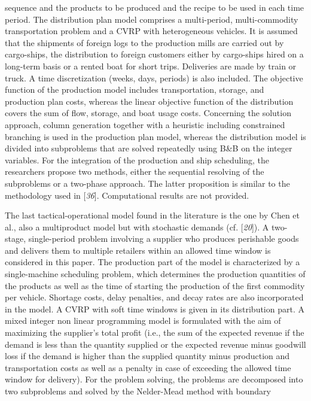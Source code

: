  sequence and the products to be produced and the recipe to be used in each time
 period. The distribution plan model comprises a multi-period, multi-commodity
 transportation problem and a CVRP with heterogeneous vehicles. It is assumed that the
 shipments of foreign logs to the production mills are carried out by cargo-ships, the
 distribution to foreign customers either by cargo-ships hired on a long-term basis or
 a rented boat for short trips. Deliveries are made by train or truck. A time
 discretization (weeks, days, periods) is also included. The objective function of the
 production model includes transportation, storage, and production plan costs, whereas
 the linear objective function of the distribution covers the sum of flow, storage,
 and boat usage costs. Concerning the solution approach, column generation together
 with a heuristic including constrained branching is used in the production plan
 model, whereas the distribution model is divided into subproblems that are solved
 repeatedly using B\&B on the integer variables. For the integration of the
 production and ship scheduling, the researchers propose two methods, either the
 sequential resolving of the subproblems or a two-phase approach. The latter
 proposition is similar to the methodology used in [\textit{36}]. Computational results are not provided.\par The last tactical-operational model found in the literature is the one by Chen et
 al., also a multiproduct model but with stochastic demands (cf. [\textit{20}]). A two-stage, single-period problem
 involving a supplier who produces perishable goods and delivers them to multiple
 retailers within an allowed time window is considered in this paper. The production
 part of the model is characterized by a single-machine scheduling problem, which
 determines the production quantities of the products as well as the time of starting
 the production of the first commodity per vehicle. Shortage costs, delay penalties,
 and decay rates are also incorporated in the model. A CVRP with soft time windows is
 given in its distribution part. A mixed integer non linear programming model is
 formulated with the aim of maximizing the supplier's total profit (i.e., the sum of
 the expected revenue if the demand is less than the quantity supplied or the expected
 revenue minus goodwill loss if the demand is higher than the supplied quantity minus
 production and transportation costs as well as a penalty in case of exceeding the
 allowed time window for delivery). For the problem solving, the problems are
 decomposed into two subproblems and solved by the Nelder-Mead method with boundary
